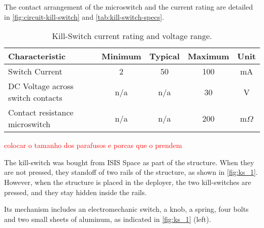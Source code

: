 
The contact arrangement of the microswitch and the current rating are detailed in \autoref{fig:circuit-kill-switch} and \autoref{tab:kill-switch-specs}.


\begin{table}[!h]
	\centering
	\begin{tabular}{lcccc}
		\toprule[1.5pt]
		\textbf{Characteristic} & \textbf{Minimum} & \textbf{Typical} & \textbf{Maximum} & \textbf{Unit} \\
		\midrule
		Switch Current                      & 2     & 50    & 100   & mA \\
		DC Voltage across switch contacts   & n/a   & n/a   & 30    & V \\
		Contact resistance microswitch      & n/a   & n/a   & 200   & m$\Omega$ \\
		\bottomrule[1.5pt]
	\end{tabular}
	\caption{Kill-Switch current rating and voltage range.}
	\label{tab:kill-switch-specs}
\end{table}

\textcolor{red}{colocar o tamanho dos parafusos e porcas que o prendem}

The kill-switch was bought from ISIS Space as part of the structure. When they are not pressed, they standoff of two rails of the structure, as shown in \autoref{fig:ks_1}. However, when the structure is placed in the deployer, the two kill-switches are pressed, and they stay hidden inside the rails.

Its mechanism includes an electromechanic switch, a knob, a spring, four bolts and two small sheets of aluminum, as indicated in \autoref{fig:ks_1} (left).

